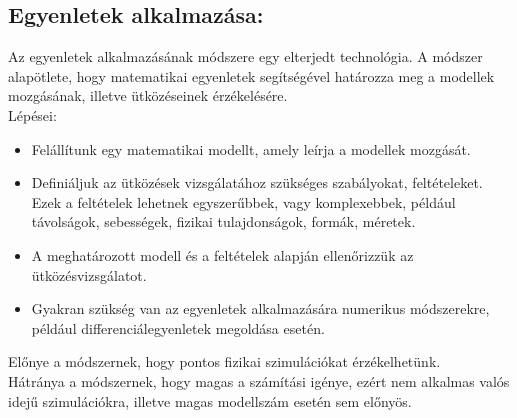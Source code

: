 \newpage
\subsection{Egyenletek alkalmazása:}
Az egyenletek alkalmazásának módszere egy elterjedt technológia. A módszer alapötlete, hogy matematikai egyenletek segítségével határozza meg a modellek mozgásának, illetve ütközéseinek érzékelésére.
\\
Lépései:
\begin{itemize}
\item Felállítunk egy matematikai modellt, amely leírja a modellek mozgását.

\item Definiáljuk az ütközések vizsgálatához szükséges szabályokat, feltételeket. Ezek a feltételek lehetnek egyszerűbbek, vagy komplexebbek, például távolságok, sebességek, fizikai tulajdonságok, formák, méretek.

\item A meghatározott modell és a feltételek alapján ellenőrizzük az ütközésvizsgálatot.\

\item Gyakran szükség van az egyenletek alkalmazására numerikus módszerekre, például differenciálegyenletek megoldása esetén.
\end{itemize}
Előnye a módszernek, hogy pontos fizikai szimulációkat érzékelhetünk.\\
Hátránya a módszernek, hogy magas a számítási igénye, ezért nem alkalmas valós idejű szimulációkra, illetve magas modellszám esetén sem előnyös.